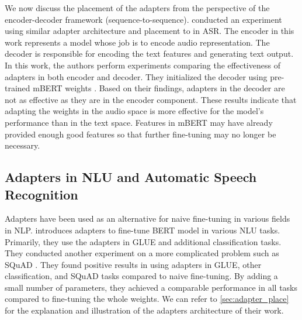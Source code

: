 We now discuss the placement of the adapters from the perspective of the encoder-decoder framework (sequence-to-sequence). \cite{winata2020adapt} conducted an experiment using similar adapter architecture and placement to \cite{bapna2019simple} in ASR. The encoder in this work represents a model whose job is to encode audio representation. The decoder is responsible for encoding the text features and generating text output. In this work, the authors perform experiments comparing the effectiveness of adapters in both encoder and decoder. They initialized the decoder using pre-trained mBERT weights \cite{devlin2018bert}. Based on their findings, adapters in the decoder are not as effective as they are in the encoder component. These results indicate that adapting the weights in the audio space is more effective for the model's performance than in the text space. Features in mBERT may have already provided enough good features so that further fine-tuning may no longer be necessary.

\subsection{Adapters in NLU and Automatic Speech Recognition}
\label{sec:app_nlu_asr}
Adapters have been used as an alternative for naive fine-tuning in various fields in NLP. \cite{houlsby2019parameter} introduces adapters to fine-tune BERT model in various NLU tasks. Primarily, they use the adapters in GLUE \cite{wang2018glue} and additional classification tasks. They conducted another experiment on a more complicated problem such as SQuAD \cite{rajpurkar2018know}. They found positive results in using adapters in GLUE, other classification, and SQuAD tasks compared to naive fine-tuning. By adding a small number of parameters, they achieved a comparable performance in all tasks compared to fine-tuning the whole weights. We can refer to \cref{sec:adapter_place} for the explanation and illustration of the adapters architecture of their work.

